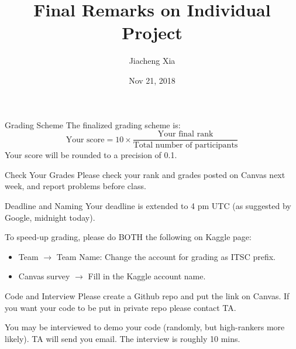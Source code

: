\documentclass{beamer}
\title{Final Remarks on Individual Project}
\author{Jiacheng Xia}
\date{Nov 21, 2018}
\begin{document}
\maketitle
\begin{frame}{Grading Scheme}
The finalized grading scheme is:
\begin{equation*}
	\textrm{Your score} = 10 \times \frac{\textrm{Your final rank}}{\textrm{Total number of participants}}
\end{equation*}
Your score will be rounded to a precision of 0.1.

\begin{block}{Check Your Grades}
Please check your rank and grades posted on Canvas next week, and report problems before class.	
\end{block}
\end{frame}

\begin{frame}{Deadline and Naming}
Your deadline is extended to 4 pm UTC (as suggested by Google, midnight today).

To speed-up grading, please do BOTH the following on Kaggle page: 
\begin{itemize}
	\item{Team $\rightarrow$ Team Name: Change the account for grading as ITSC prefix. }
	\item{Canvas survey $\rightarrow$ Fill in the Kaggle account name.}
\end{itemize}
\end{frame}


\begin{frame}{Code and Interview}	
Please create a Github repo and put the link on Canvas. If you want your code to be put in private repo please contact TA.

You may be interviewed to demo your code (randomly, but high-rankers more likely). TA will send you email. The interview is roughly 10 mins.
\end{frame}
\end{document}
